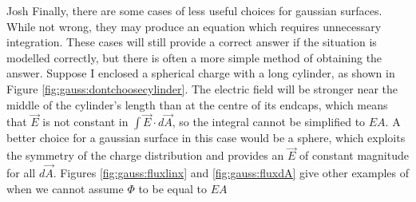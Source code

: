 \begin{studentOpinion}{Josh}
	Finally, there are some cases of less useful choices for gaussian surfaces. While not wrong, they may produce an equation which requires unnecessary integration. These cases will still provide a correct answer if the situation is modelled correctly, but there is often a more simple method of obtaining the answer. Suppose I enclosed a spherical charge with a long cylinder, as shown in Figure \ref{fig:gauss:dontchoosecylinder}. The electric field will be stronger near the middle of the cylinder's length than at the centre of its endcaps, which means that $\vec E$ is not constant in $\int \vec E \cdot d \vec A$, so the integral cannot be simplified to $EA$. A better choice for a gaussian surface in this case would be a sphere, which exploits the symmetry of the charge distribution and provides an $\vec E$ of constant magnitude for all $d \vec A$. Figures \ref{fig:gauss:fluxlinx} and \ref{fig:gauss:fluxdA} give other examples of when we cannot assume $\Phi$ to be equal to $EA$
	
	
\end{studentOpinion}

